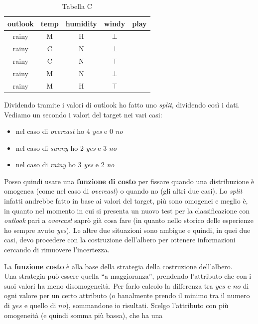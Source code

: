 \documentclass[a4paper,12pt, oneside]{book}
\begin{document}
\begin{esempio}
\begin{table}[H]
    \centering
    \begin{tabular}{c|c|c|c|c}
      outlook & temp & humidity & windy & play\\
      \hline
      rainy & M & H & $\bot$ & \color{darkgreen}{yes}\\
      rainy & C & N & $\bot$ & \color{darkgreen}{yes}\\
      rainy & C & N & $\top$ & \color{red}{no}\\
      rainy & M & N & $\bot$ & \color{darkgreen}{yes}\\
      rainy & M & H & $\top$ & \color{red}{no}
    \end{tabular}
    \caption{Tabella C}
  \end{table}
  Dividendo tramite i valori di outlook ho fatto uno \textit{split}, dividendo
  così i dati.\\
  Vediamo un secondo i valori del target nei vari casi:
  \begin{itemize}
    \item nel caso di \textit{overcast} ho 4 \textit{yes} e 0 \textit{no}
    \item nel caso di \textit{sunny} ho 2 \textit{yes} e 3 \textit{no}
    \item nel caso di \textit{rainy} ho 3 \textit{yes} e 2 \textit{no}
  \end{itemize}
  Posso quindi usare una \textbf{funzione di costo} per fissare quando una
  distribuzione è omogenea (come nel caso di \textit{overcast}) o quando no (gli
  altri due casi). Lo \textit{split} infatti andrebbe fatto in base ai valori
  del target, più sono omogenei e meglio è, in quanto nel momento in cui si
  presenta un nuovo test per la classificazione con \textit{outlook} pari a
  \textit{overcast} saprò già cosa fare (in quanto nello storico delle
  esperienze ho sempre avuto \textit{yes}). Le altre due situazioni sono
  ambigue e quindi, in quei due casi, devo procedere con la costruzione
  dell'albero per ottenere informazioni cercando di rimuovere l'incertezza.  
\end{esempio}
La \textbf{funzione costo} è alla base della strategia della costruzione
dell'albero.\\
Una strategia può essere quella ``a maggioranza'', prendendo l'attributo che con
i suoi valori ha meno disomogeneità. Per farlo calcolo la differenza tra $yes$ e
$no$ di ogni valore per un certo attributo (o banalmente prendo il minimo tra il
numero di $yes$ e quello di $no$), sommandone io risultati. Scelgo
l'attributo con più omogeneità (e quindi somma più bassa), che ha una
\end{document}
